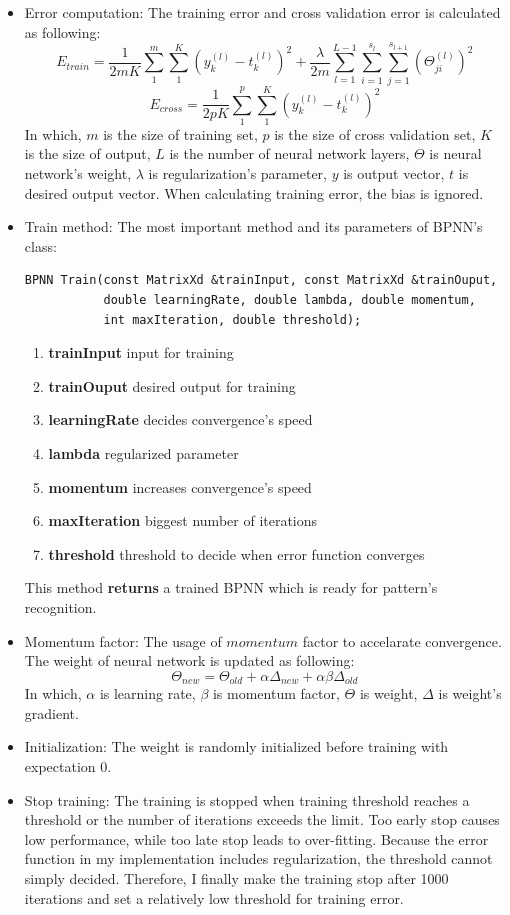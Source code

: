 \documentclass[a4paper, 11pt]{article}
\begin{document}
\begin{itemize}
\item Error computation: The training error and cross validation error is calculated as following:
  \[E_{train}=\frac{1}{2mK}\sum\limits_{1}^{m}{\sum\limits_{1}^{K}{(y_{k}^{(l)}-t_{k}^{(l)})^2}}+
  \frac{\lambda}{2m} \sum\limits_{l=1}^{L-1} {\sum\limits_{i=1}^{s_l} {\sum\limits_{j=1}^{s_{l+1}}{(\Theta_{ji}^{(l)})^2} } } \]
  \[E_{cross}=\frac{1}{2pK}\sum\limits_{1}^{p}{\sum\limits_{1}^{K}{(y_{k}^{(l)}-t_{k}^{(l)})^2}}\]
  In which, $m$ is the size of training set, $p$ is the size of cross validation set, $K$ is the size of output, $L$ is the number of neural network layers, $\Theta$ is neural network's weight, $\lambda$ is regularization's parameter, $y$ is output vector, $t$ is desired output vector. When calculating training error, the bias is ignored.

\item Train method: The most important method and its parameters of BPNN's class:
\begin{lstlisting}
BPNN Train(const MatrixXd &trainInput, const MatrixXd &trainOuput, 
           double learningRate, double lambda, double momentum, 
           int maxIteration, double threshold);
\end{lstlisting}
  \begin{enumerate}
  \item \textbf{trainInput} input for training
  \item \textbf{trainOuput} desired output for training
  \item \textbf{learningRate} decides convergence's speed
  \item \textbf{lambda} regularized parameter
  \item \textbf{momentum} increases convergence's speed
  \item \textbf{maxIteration} biggest number of iterations
  \item \textbf{threshold} threshold to decide when error function converges
  \end{enumerate}
  This method \textbf{returns} a trained BPNN which is ready for pattern's recognition. 
\item Momentum factor: The usage of $momentum$ factor to accelarate convergence. The weight of neural network is updated as following:
  \[ \Theta_{new} = \Theta_{old} +\alpha\Delta_{new} + \alpha\beta\Delta_{old} \]
  In which, $\alpha$ is learning rate, $\beta$ is momentum factor, $\Theta$ is weight, $\Delta$ is weight's gradient.
\item Initialization: The weight is randomly initialized before training with expectation 0.
\item Stop training: The training is stopped when training threshold reaches a threshold or the number of iterations exceeds the limit. Too early stop causes low performance, while too late stop leads to over-fitting. Because the error function in my implementation includes regularization, the threshold cannot simply decided. Therefore, I finally make the training stop after 1000 iterations and set a relatively low threshold for training error.
\end{itemize}
\end{document}

